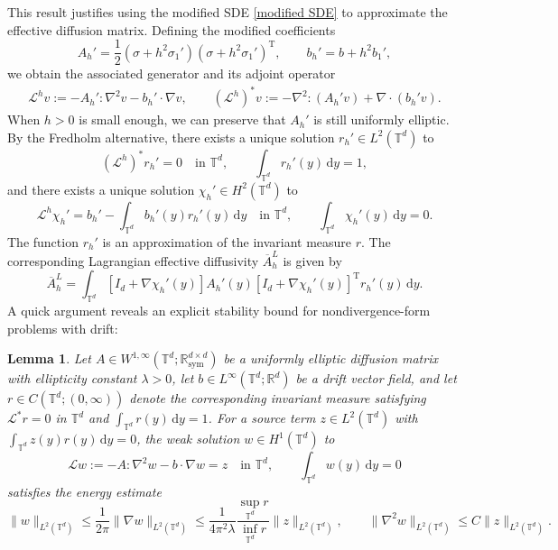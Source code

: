 \documentclass[12pt,a4paper,reqno]{amsart}
\newtheorem{lemma}{Lemma}[section]
\newcommand{\R}{\mathbb{R}}
\newcommand{\T}{\mathbb{T}}
\numberwithin{equation}{section}
\begin{document}
This result justifies using the modified SDE \eqref{modified SDE} to approximate the effective diffusion matrix. Defining the modified coefficients
\begin{equation}\label{Ahp bhp}
		A_h' = \frac{1}{2}(\sigma + h^2\sigma_1')(\sigma + h^2\sigma_1')^{\mathrm{T}}, \qquad
		b_h' = b + h^2b_1',
\end{equation}
we obtain the associated generator and its adjoint operator 
\begin{align*}
    \mathcal{L}^{h} v := - A_h':\nabla^2 v  -b_h'\cdot \nabla v,\qquad    \left(\mathcal{L}^{h}\right)^* v  := - \nabla^2:\left(A_h'v\right)+ \nabla\cdot \left(b_h'v\right).
\end{align*}
When $h>0$ is small enough, we can preserve that $A_h'$ is still uniformly elliptic. By the Fredholm alternative, there exists a unique solution $r_h'\in L^2(\mathbb{T}^d)$ to
\begin{equation*}
    (\mathcal{L}^h)^*r_h' = 0\quad\text{in }\mathbb{T}^d,\qquad \int_{\mathbb{T}^d} r_h'(y)\,\mathrm{d}y = 1,
\end{equation*}
and there exists a unique solution $\chi_h'\in H^2(\mathbb{T}^d)$ to
\begin{equation*}
    \mathcal{L}^h \chi_h' = b_h' - \int_{\mathbb{T}^d} b_h'(y)r_h'(y)\, \mathrm{d}y \quad\text{in }\mathbb{T}^d,\qquad \int_{\mathbb{T}^d}\chi_h'(y)\,\mathrm{d}y = 0.
\end{equation*}
The function $r_h'$ is an approximation of the invariant measure $r$. The corresponding Lagrangian effective diffusivity $\overline{A}^L_h$ is given by
\begin{equation}\label{A^L_h}
    \overline{A}^L_h = \int_{\mathbb{T}^d}[I_d + \nabla \chi_h'(y)]A_h'(y)[I_d + \nabla \chi_h'(y)]^{\mathrm{T}} r_h'(y)\,\mathrm{d}y.
\end{equation}
A quick argument reveals an explicit stability bound for nondivergence-form problems with drift:
\begin{lemma}\label{chi_h' estimate}
    Let $A\in W^{1,\infty}(\T^d;\R^{d\times d}_{\mathrm{sym}})$ be a uniformly elliptic diffusion matrix with ellipticity constant $\lambda>0$, let $b\in L^{\infty}(\T^d;\R^d)$ be a drift vector field, and let $r\in C(\T^d;(0,\infty))$ denote the corresponding invariant measure satisfying $\mathcal{L}^*r=0$ in $\mathbb{T}^d$ and $\int_{\mathbb{T}^d} r(y)\,\mathrm{d}y = 1$. For a source term $z \in L^2(\mathbb{T}^d)$ with $\int_{\mathbb{T}^d} z(y)r(y)\,\mathrm{d}y = 0$, the weak solution $w\in H^1(\mathbb{T}^d)$ to 
    \begin{equation}\label{standard cell problem}
    	\mathcal{L} w := - A:\nabla^2 w  -b\cdot \nabla w  = z\quad\text{in }\T^d,\qquad \int_{\mathbb{T}^d}w(y)\,\mathrm{d}y = 0
    \end{equation} 
    satisfies the energy estimate 
       \begin{equation*}
    	\|w\|_{L^2(\T^d)} \leq \frac{1}{2\pi} \|\nabla w\|_{L^2(\T^d)} \le \frac{1}{4\pi^2 \lambda} \frac{\sup_{\T^d}r}{\inf_{\T^d}r} \|z\|_{L^2(\T^d)},\qquad \|\nabla^2 w\|_{L^2(\T^d)} \leq C \|z\|_{L^2(\T^d)}.
    \end{equation*}
\end{lemma}
\end{document}
